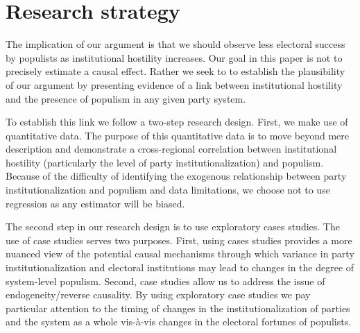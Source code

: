 \documentclass[a4paper,12pt]{article}\usepackage[]{graphicx}\usepackage[]{color}
\begin{document}
\section*{Research strategy}
The implication of our argument is that we should observe less electoral success by populists as institutional hostility increases. Our goal in this paper is not to precisely estimate a causal effect. Rather we seek to to establish the plausibility of our argument by presenting evidence of a link between institutional hostility and the presence of populism in any given party system. 
\par
To establish this link we follow a two-step research design. First, we make use of quantitative data. The purpose of this quantitative data is to move beyond mere description and demonstrate a cross-regional correlation between institutional hostility (particularly the level of party institutionalization) and populism. Because of the difficulty of identifying the exogenous relationship between party institutionalization and populism and data limitations, we choose not to use regression as any estimator will be biased.
\par
The second step in our research design is to use exploratory cases studies. The use of case studies serves two purposes. First, using cases studies provides a more nuanced view of the potential causal mechanisms through which variance in party institutionalization and electoral institutions may lead to changes in the degree of system-level populism. Second, case studies allow us to address the issue of endogeneity/reverse causality. %
By using exploratory case studies we pay particular attention to the timing of changes in the institutionalization of parties and the system as a whole vis-\`{a}-vis changes in the electoral fortunes of populists. 
\end{document}
